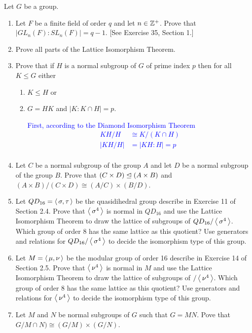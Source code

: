 \documentclass[10pt,a4paper]{report}
\newcommand{\BLUE}[1]{\textcolor{blue}{#1}}
\begin{document}
Let $G$ be a group.
\begin{enumerate}
\item Let $F$ be a finite field of order $q$ and let $n \in \mathbb{Z}^+$.  Prove that $|GL_n(F) : SL_n(F)|=q-1$.  [See Exercise 35, Section 1.]

\item Prove all parts of the Lattice Isomorphism Theorem.

\item Prove that if $H$ is a normal subgroup of $G$ of prime index $p$ then for all $K \le G$ either 
\begin{enumerate}
	\item $K \le H$ or
	\item $G = HK$ and $|K:K\cap H|=p$.
	
	\BLUE{First, according to the Diamond Isomorphism Theorem 
	\begin{align*}
		KH/H &\cong K/(K\cap H) \\
		|KH/H| &= |KH: H| = p\\
	\end{align*}
	}
	
\end{enumerate}

\item Let $C$ be a normal subgroup of the group $A$ and let $D$ be a normal subgroup of the group $B$.  Prove that $(C \times D) \trianglelefteq (A \times B)$ and $(A\times B)/(C\times D) \cong (A/C)\times (B/D)$.

\item Let $Q D_{16}=\left \langle\, \sigma, \tau \,\right \rangle$ be the quasidihedral group describe in Exercise 11 of Section 2.4.  Prove that $\left \langle\, \sigma^4 \,\right \rangle$ is normal in $Q D_{16}$ and use the Lattice Isomorphism Theorem to draw the lattice of subgroups of $Q D_{16}/\left \langle\, \sigma^4 \,\right \rangle$.  Which group of order 8 has the same lattice as this quotient? Use generators and relations for $Q D_{16}/\left \langle\, \sigma^4 \,\right \rangle$ to decide the isomorphism type of this group.

\item Let $M = \left \langle\, \mu,\nu \,\right \rangle$ be the modular group of order 16 describe in Exercise 14 of Section 2.5. Prove that $\left \langle\, \nu^4 \,\right \rangle$ is normal in $M$ and use the Lattice Isomorphism Theorem to draw the lattice of subgroups of $/\left \langle\, \nu^4 \,\right \rangle$. Which group of order 8 has the same lattice as this quotient?  Use generators and relations for $\left \langle\, \nu^4 \,\right \rangle$ to decide the isomorphism type of this group.

\item Let $M$ and $N$ be normal subgroups of $G$ such that $G = MN$.  Pove that $G/M\cap N)\cong (G/M)\times (G/N)$.


\end{enumerate}
\end{document}
